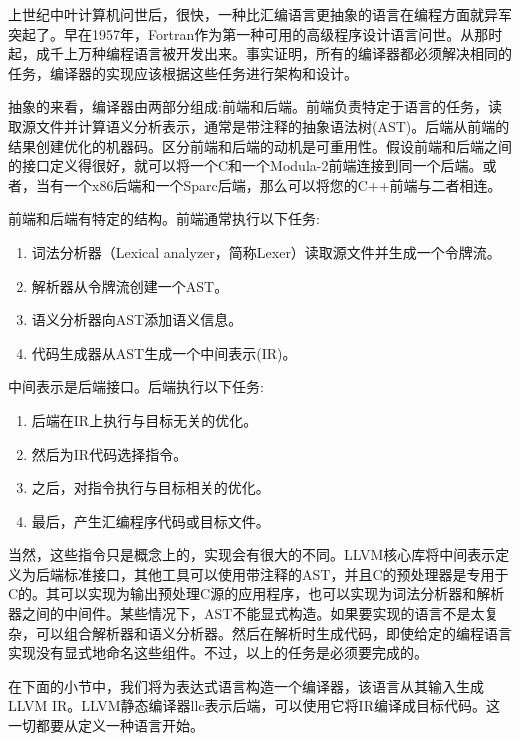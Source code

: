 上世纪中叶计算机问世后，很快，一种比汇编语言更抽象的语言在编程方面就异军突起了。早在1957年，Fortran作为第一种可用的高级程序设计语言问世。从那时起，成千上万种编程语言被开发出来。事实证明，所有的编译器都必须解决相同的任务，编译器的实现应该根据这些任务进行架构和设计。\par

抽象的来看，编译器由两部分组成:前端和后端。前端负责特定于语言的任务，读取源文件并计算语义分析表示，通常是带注释的抽象语法树(AST)。后端从前端的结果创建优化的机器码。区分前端和后端的动机是可重用性。假设前端和后端之间的接口定义得很好，就可以将一个C和一个Modula-2前端连接到同一个后端。或者，当有一个x86后端和一个Sparc后端，那么可以将您的C++前端与二者相连。\par

前端和后端有特定的结构。前端通常执行以下任务:\par

\begin{enumerate}
\item 词法分析器（Lexical analyzer，简称Lexer）读取源文件并生成一个令牌流。
\item 解析器从令牌流创建一个AST。
\item 语义分析器向AST添加语义信息。
\item 代码生成器从AST生成一个中间表示(IR)。
\end{enumerate}

中间表示是后端接口。后端执行以下任务:\par

\begin{enumerate}
\item 后端在IR上执行与目标无关的优化。
\item 然后为IR代码选择指令。
\item 之后，对指令执行与目标相关的优化。
\item 最后，产生汇编程序代码或目标文件。
\end{enumerate}

当然，这些指令只是概念上的，实现会有很大的不同。LLVM核心库将中间表示定义为后端标准接口，其他工具可以使用带注释的AST，并且C的预处理器是专用于C的。其可以实现为输出预处理C源的应用程序，也可以实现为词法分析器和解析器之间的中间件。某些情况下，AST不能显式构造。如果要实现的语言不是太复杂，可以组合解析器和语义分析器。然后在解析时生成代码，即使给定的编程语言实现没有显式地命名这些组件。不过，以上的任务是必须要完成的。\par

在下面的小节中，我们将为表达式语言构造一个编译器，该语言从其输入生成LLVM IR。LLVM静态编译器llc表示后端，可以使用它将IR编译成目标代码。这一切都要从定义一种语言开始。\par






















